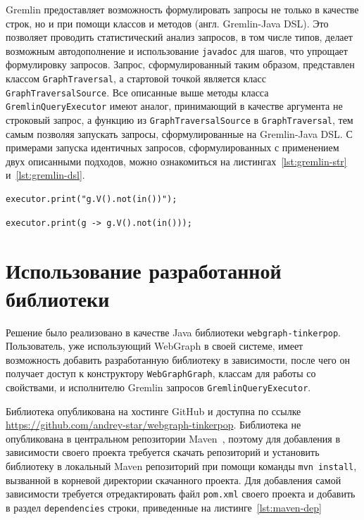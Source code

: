 \documentclass[times,specification,annotation]{itmo-student-thesis}
\begin{document}
Gremlin предоставляет возможность формулировать запросы не только в качестве строк, но и при помощи классов и методов (англ. Gremlin-Java DSL). Это позволяет проводить статистический анализ запросов, в том числе типов, делает возможным автодополнение и использование \texttt{javadoc} для шагов, что упрощает формулировку запросов. Запрос, сформулированный таким образом, представлен классом \texttt{GraphTraversal}, а стартовой точкой является класс \texttt{GraphTraversalSource}. Все описанные выше методы класса \texttt{GremlinQueryExecutor} имеют аналог, принимающий в качестве аргумента не строковый запрос, а функцию из \texttt{GraphTraversalSource} в \texttt{GraphTraversal}, тем самым позволяя запускать запросы, сформулированные на Gremlin-Java DSL. С примерами запуска идентичных запросов, сформулированных с применением двух описанными подходов, можно ознакомиться на листингах~\ref{lst:gremlin-str} и~\ref{lst:gremlin-dsl}.

\begin{lstlisting}[float=!h,caption={Строковый Gremlin  запрос},label={lst:gremlin-str}]
executor.print("g.V().not(in())");
\end{lstlisting}

\begin{lstlisting}[float=!h,caption={Запрос на Gremlin-Java DSL},label={lst:gremlin-dsl}]
executor.print(g -> g.V().not(in()));
\end{lstlisting}

\section{Использование разработанной библиотеки}

Решение было реализовано в качестве Java библиотеки \texttt{webgraph-tinkerpop}. Пользователь, уже использующий WebGraph в своей системе, имеет возможность добавить разработанную библиотеку в зависимости, после чего он получает доступ к конструктору \texttt{WebGraphGraph}, классам для работы со свойствами, и исполнителю Gremlin запросов \texttt{GremlinQueryExecutor}.

Библиотека опубликована на хостинге GitHub и доступна по ссылке \url{https://github.com/andrey-star/webgraph-tinkerpop}. Библиотека не опубликована в центральном репозитории Maven~\cite{maven}, поэтому для добавления в зависимости своего проекта требуется скачать репозиторий и установить библиотеку в локальный Maven репозиторий при помощи команды \texttt{mvn install}, вызванной в корневой директории скачанного проекта. Для добавления самой зависимости требуется отредактировать файл \texttt{pom.xml} своего проекта и добавить в раздел \texttt{dependencies} строки, приведенные на листинге~\ref{lst:maven-dep}
\end{document}
